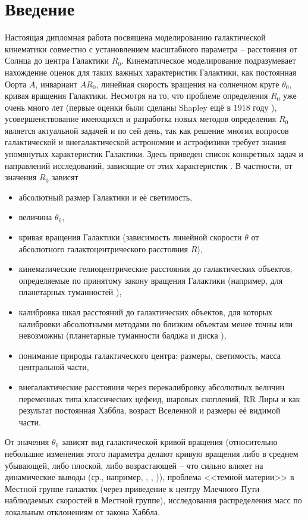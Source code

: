 \documentclass{matmex-diploma-custom}
\begin{document}
\section*{Введение}
Настоящая дипломная работа посвящена моделированию галактической кинематики совместно с установлением масштабного параметра -- расстояния от Солнца до центра Галактики $R_0$. Кинематическое моделирование подразумевает нахождение оценок для таких важных характеристик Галактики, как постоянная Оорта $A$, инвариант $AR_0$, линейная скорость вращения на солнечном круге $\theta_0$, кривая вращения Галактики. Несмотря на то, что проблеме определения $R_0$ уже очень много лет (первые оценки были сделаны Shapley ещё в 1918 году \cite{7}), усовершенствование имеющихся и разработка новых методов определения $R_0$ является актуальной задачей и по сей день, так как решение многих вопросов галактической и внегалактической астрономии и астрофизики требует знания упомянутых характеристик Галактики. Здесь приведен список конкретных задач и направлений исследований, зависящие от этих характеристик \cite{8}. В частности, от значения $R_0$ зависят 
\begin{itemize}
        \item абсолютный размер Галактики и её светимость,
        \item величина $\theta_0$,
        \item кривая вращения Галактики (зависимость линейной скорости $\theta$ от абсолютного галактоцентрического расстояния $R$),
        \item кинематические гелиоцентрические расстояния до галактических объектов, определяемые по принятому закону вращения Галактики (например, для планетарных туманностей \cite{4}),
        \item калибровка шкал расстояний до галактических объектов, для которых калибровки абсолютными методами по близким объектам менее точны или невозможны (планетарные туманности балджа \cite{12} и диска \cite{11}),
        \item понимание природы галактического центра: размеры, светимость, масса центральной части,
        \item внегалактические расстояния через перекалибровку абсолютных величин переменных типа классических цефеид, шаровых скоплений, RR Лиры и как результат постоянная Хаббла, возраст Вселенной и размеры её видимой части. 
\end{itemize}
\par От значения $\theta_0$ зависят вид галактической кривой вращения (относительно небольшие изменения этого параметра делают кривую вращения либо в среднем убывающей, либо плоской, либо возрастающей -- что сильно влияет на динамические выводы (ср., например, \cite{17}, \cite{18}, \cite{19})), проблема <<темной материи>> в Местной группе галактик (через приведение к центру Млечного Пути наблюдаемых скоростей в Местной группе), исследования распределения масс по локальным отклонениям от закона Хаббла.
\end{document}
